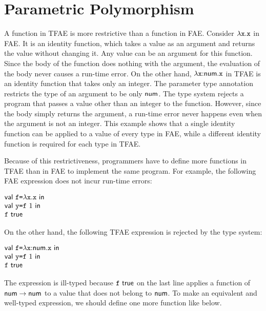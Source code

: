 \setchapterpreamble[u]{\margintoc}
\chapter{Parametric Polymorphism}

\renewcommand{\plang}{\textsf{TFAE}\xspace}
\renewcommand{\lang}{\textsf{PTFAE}\xspace}

A function in \plang is more restrictive than a function in \textsf{FAE}. Consider
$\lambda\texttt{x}.\texttt{x}$ in \textsf{FAE}. It is an identity function, which takes a value as an
argument and returns the value without changing it. Any value can be an argument
for this function. Since the body of the function does nothing with the argument,
the evaluation of the body never causes a run-time error. On the other hand,
$\lambda\texttt{x}{:}\textsf{num}.\texttt{x}$ in \plang is an identity function that takes only an
integer. The parameter type annotation restricts the type of an argument to be
only $\textsf{num}$. The type system rejects a program that passes a value other than
an integer to the function. However, since the body simply returns the argument,
a run-time error never happens even when the argument is not an integer.
This example shows that a single identity function can be applied to a value of
every type in \textsf{FAE}, while a different identity function is required for
each type in \plang.

Because of this restrictiveness, programmers have to define more functions in
\plang than in \textsf{FAE} to implement the same program. For example, the
following \textsf{FAE} expression does not incur run-time errors:

$
  \begin{array}{@{}l}
    \ebind{\cf}{\efun{\cx}{\cx}}{\\
    \ebind{\cy}{\cf\ 1}{\\
    \cf\ \textsf{true}
    }}
  \end{array}
$

On the other hand, the following \plang expression is rejected by the type
system:

$
  \begin{array}{@{}l}
    \ebind{\cf}{\efunt{\cx}{\tnum}{\cx}}{\\
    \ebind{\cy}{\cf\ 1}{\\
    \cf\ \textsf{true}
    }}
  \end{array}
$

The expression is ill-typed because $\cf\ \textsf{true}$ on the last line
applies a function of $\textsf{num}\rightarrow\textsf{num}$ to a value that does not belong to
$\textsf{num}$. To make an equivalent and well-typed expression, we should define
one more function like below.


